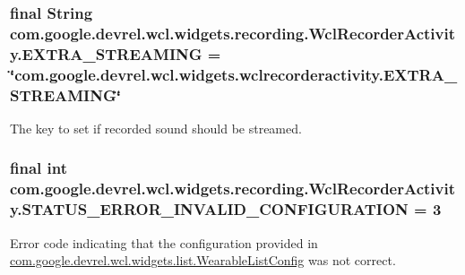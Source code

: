 \subsubsection[{\texorpdfstring{E\+X\+T\+R\+A\+\_\+\+S\+T\+R\+E\+A\+M\+I\+NG}{EXTRA_STREAMING}}]{\setlength{\rightskip}{0pt plus 5cm}final String com.\+google.\+devrel.\+wcl.\+widgets.\+recording.\+Wcl\+Recorder\+Activity.\+E\+X\+T\+R\+A\+\_\+\+S\+T\+R\+E\+A\+M\+I\+NG = \char`\"{}com.\+google.\+devrel.\+wcl.\+widgets.\+wclrecorderactivity.\+E\+X\+T\+R\+A\+\_\+\+S\+T\+R\+E\+A\+M\+I\+NG\char`\"{}\hspace{0.3cm}{\ttfamily [static]}}\hypertarget{classcom_1_1google_1_1devrel_1_1wcl_1_1widgets_1_1recording_1_1WclRecorderActivity_a936b85e81af33279b334a432049c94ee}{}\label{classcom_1_1google_1_1devrel_1_1wcl_1_1widgets_1_1recording_1_1WclRecorderActivity_a936b85e81af33279b334a432049c94ee}
The key to set if recorded sound should be streamed. 
\subsubsection[{\texorpdfstring{S\+T\+A\+T\+U\+S\+\_\+\+E\+R\+R\+O\+R\+\_\+\+I\+N\+V\+A\+L\+I\+D\+\_\+\+C\+O\+N\+F\+I\+G\+U\+R\+A\+T\+I\+ON}{STATUS_ERROR_INVALID_CONFIGURATION}}]{\setlength{\rightskip}{0pt plus 5cm}final int com.\+google.\+devrel.\+wcl.\+widgets.\+recording.\+Wcl\+Recorder\+Activity.\+S\+T\+A\+T\+U\+S\+\_\+\+E\+R\+R\+O\+R\+\_\+\+I\+N\+V\+A\+L\+I\+D\+\_\+\+C\+O\+N\+F\+I\+G\+U\+R\+A\+T\+I\+ON = 3\hspace{0.3cm}{\ttfamily [static]}}\hypertarget{classcom_1_1google_1_1devrel_1_1wcl_1_1widgets_1_1recording_1_1WclRecorderActivity_a589e34600557e9c6c53a894e9bc76cd9}{}\label{classcom_1_1google_1_1devrel_1_1wcl_1_1widgets_1_1recording_1_1WclRecorderActivity_a589e34600557e9c6c53a894e9bc76cd9}
Error code indicating that the configuration provided in \hyperlink{classcom_1_1google_1_1devrel_1_1wcl_1_1widgets_1_1list_1_1WearableListConfig}{com.\+google.\+devrel.\+wcl.\+widgets.\+list.\+Wearable\+List\+Config} was not correct.

